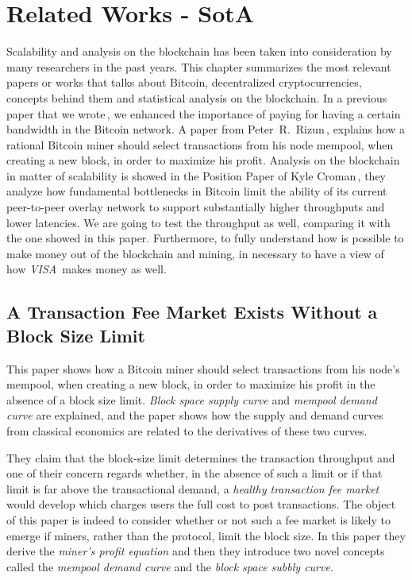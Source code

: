 \documentclass[USenglish]{uit-thesis}
\begin{document}
\chapter{Related Works - SotA}
\label{chap:prev_works}
Scalability and analysis on the blockchain has been taken into consideration
by many researchers in the past years.
This chapter summarizes the most relevant papers or works that talks about Bitcoin,
decentralized cryptocurrencies, concepts behind them and statistical analysis on the
blockchain. In a previous paper that we wrote\,\cite{Tedeschi:2016:PBB}, we enhanced the
importance of paying for having a certain bandwidth in the Bitcoin network. A paper
from Peter~R.~Rizun\,\cite{Rizun:2015:blocksizelimit}, explains how a rational Bitcoin
miner should select transactions from his node mempool, when creating a new block,
in order to maximize his profit. Analysis on the blockchain in matter of
scalability is showed in the Position Paper of Kyle Croman\,\cite{croman2016}, they
analyze how fundamental bottlenecks in Bitcoin limit the ability of its current peer-to-peer
overlay network to support substantially higher throughputs and lower latencies. We are
going to test the throughput as well, comparing it with the one showed in this paper.
Furthermore, to fully understand how is possible to make money out of the blockchain and mining,
in necessary to have a view of how \emph{VISA}\,\cite{visa} makes money as well.

\section{A Transaction Fee Market Exists Without a Block Size Limit}
\label{sec:rizun}
This paper shows how a Bitcoin miner should select transactions from his node's mempool,
when creating a new block, in order to maximize his profit in the absence of a block size limit.
\emph{Block space supply curve} and \emph{mempool demand curve} are explained, and the
paper shows how the supply and demand curves from classical economics are related to the
derivatives of these two curves.

They claim that the block-size limit determines the transaction throughput and one of their
concern regards whether, in the absence of such a limit or if that limit is far above the
transactional demand, a \emph{healthy transaction fee market} would develop which charges
users the full cost to post transactions. The object of this paper is indeed to consider
whether or not such a fee market is likely to emerge if miners, rather than the protocol,
limit the block size. In this paper they derive the \emph{miner's profit equation} and then
they introduce two novel concepts called the \emph{mempool demand curve} and the
\emph{block space subbly curve}.
\end{document}
